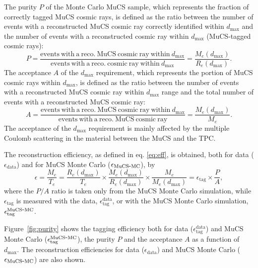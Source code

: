 \documentclass[a4paper,11pt]{article}
\def\myhyphen{{\hbox{-}}}
\begin{document}
The purity $P$ of the Monte Carlo MuCS sample, which represents the fraction of correctly tagged MuCS cosmic rays, is defined as the ratio between the number of events with a reconstructed MuCS cosmic ray correctly identified within $d_{\mathrm{max}}$ and the number of events with a reconstructed cosmic ray within $d_{\mathrm{max}}$ (MuCS-tagged cosmic rays):
\begin{equation}
  P=\frac{\mathrm{events~with~a~reco.~MuCS~cosmic~ray~within~}d_{\mathrm{max}}}{\mathrm{events~with~a~reco.~cosmic~ray~within~}d_{\mathrm{max}}} = \frac{M_{e}(d_{\mathrm{max}})}{R_{e}(d_{\mathrm{max}})}.
\end{equation}
The acceptance $A$ of the $d_{\mathrm{max}}$ requirement, which represents the portion of MuCS cosmic rays within $d_{\mathrm{max}}$, is defined as the ratio between the number of events with a reconstructed MuCS cosmic ray within $d_{\mathrm{max}}$ range and the total number of events with a reconstructed MuCS cosmic ray:
\begin{equation}
  A=\frac{\mathrm{events~with~a~reco.~MuCS~cosmic~ray~within~}d_{\mathrm{max}}}{\mathrm{events~with~a~reco.~MuCS~cosmic~ray}} = \frac{M_{e}(d_{\mathrm{max}})}{M_{e}}.
\end{equation}
The acceptance of the $d_{\mathrm{max}}$ requirement is mainly affected by the multiple Coulomb scattering in the material between the MuCS and the TPC.

The reconstruction efficiency, as defined in eq. \eqref{eq:eff}, is obtained, both for data ($\epsilon_{\mathrm{data}}$) and for MuCS Monte Carlo ($\epsilon_{\mathrm{MuCS\myhyphen MC}}$), by
\begin{equation}\label{eq:mceff}
  \epsilon = \frac{M_{e}}{T_{e}} = \frac{R_{e}(d_{\mathrm{max}})}{T_{e}} \times \frac{M_{e}(d_{\mathrm{max}})}{R_{e}(d_{\mathrm{max}})} \times \frac{M_{e}}{M_{e}(d_{\mathrm{max}})} = \epsilon_{\mathrm{tag}} \times \frac{P}{A},
\end{equation}
where the $P/A$ ratio is taken only from the MuCS Monte Carlo simulation, while $\epsilon_{\mathrm{tag}}$ is measured with the data, $\epsilon^{\mathrm{data}}_{\mathrm{tag}}$, or with the MuCS Monte Carlo simulation, $\epsilon^{\mathrm{MuCS\myhyphen MC}}_{\mathrm{tag}}$.

Figure~\ref{fig:purity} shows the tagging efficiency both for data ($\epsilon^{\mathrm{data}}_{\mathrm{tag}}$) and MuCS Monte Carlo  ($\epsilon^{\mathrm{MuCS\myhyphen MC}}_{\mathrm{tag}}$), the purity $P$ and the acceptance $A$ as a function of $d_{\mathrm{max}}$. The reconstruction efficiencies for data ($\epsilon_{\mathrm{data}}$) and MuCS Monte Carlo ($\epsilon_{\mathrm{MuCS\myhyphen MC}}$) are also shown.
\end{document}
